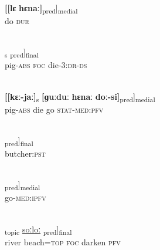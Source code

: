 \documentclass[output=paper]{LSP/langsci}
\begin{document}
\begin{exe}
\ex \label{Aiex:App44}
\gll \textbf{[[lɛ}	\textbf{hɛnaː]}\textsubscript{pred}]\textsubscript{medial}\\
do	\textsc{dur}\\
\glt {}\\
\end{exe}

\begin{exe}
\ex \label{Aiex:App45}
\gll \underline{\smash{[[kɛː-jaː]}}\textsubscript{s}	\underline{\smash{[kaː}}	\underline{\smash{ɡuːduː-saː-bi]}}\textsubscript{pred}]\textsubscript{final}\\
pig-\textsc{abs}	\textsc{foc}	die-3:\textsc{dr}-\textsc{ds}\\
\glt {}\\
\end{exe}

\begin{exe}
\ex \label{Aiex:App46}
\gll \textbf{[[kɛː-jaː]}\textsubscript{s}	\textbf{[ɡuːduː}	\textbf{hɛnaː}	\textbf{doː-si]}\textsubscript{pred}]\textsubscript{medial}\\
pig-\textsc{abs}	die	go	\textsc{stat}-\textsc{med}:\textsc{pfv}\\
\glt {}\\
\end{exe}

\begin{exe}
\ex \label{Aiex:App47}
\gll [[joːlaː]\textsubscript{pred}]\textsubscript{final}\\
butcher:\textsc{pst}\\
\glt {}\\
\end{exe}

\begin{exe}
\ex \label{Aiex:App48}
\gll [[hɛnaː-nɛː]\textsubscript{pred}]\textsubscript{medial}\\
go-\textsc{med}:\textsc{ipfv}\\
\glt {}\\
\end{exe}

\begin{exe}
\ex \label{Aiex:App49}
\gll [[haːnɛ	sɛː=jaː]\textsubscript{topic}	\underline{\smash{[kaː}}	\underline{soːloː}	\underline{\smash{di]}}\textsubscript{pred}]\textsubscript{final}\\
river	beach=\textsc{top}	\textsc{foc}	darken	\textsc{pfv}\\
\glt {}\\
\end{exe}
\end{document}
